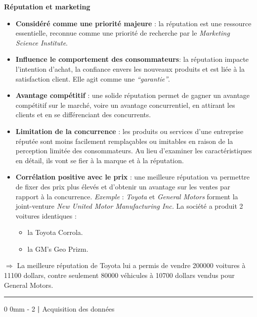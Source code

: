 \documentclass[
  12pt,
]{report}
\makeatletter
\providecommand{\tightlist}{%
  \setlength{\itemsep}{0pt}\setlength{\parskip}{0pt}}\usepackage{longtable,booktabs,array}
\renewcommand{\chapter}{%
    \clearpage %
    \@startsection{chapter}%
    {0} %
    {0mm} %
    {-\baselineskip} %
    {2\baselineskip} %
    {\normalfont\Huge\bfseries | \Huge\bfseries}%
}
\makeatother
\begin{document}
\textbf{Réputation et marketing}

\begin{itemize}
\item
  \textbf{Considéré comme une priorité majeure} : la réputation est une
  ressource essentielle, reconnue comme une priorité de recherche par le
  \emph{Marketing Science Institute}.
\item
  \textbf{Influence le comportement des consommateurs}: la réputation
  impacte l'intention d'achat, la confiance envers les nouveaux produits
  et est liée à la satisfaction client. Elle agit comme une
  \emph{``garantie''}.
\item
  \textbf{Avantage compétitif} : une solide réputation permet de gagner
  un avantage compétitif sur le marché, voire un avantage concurrentiel,
  en attirant les clients et en se différenciant des concurrents.
\item
  \textbf{Limitation de la concurrence} : les produits ou services d'une
  entreprise réputée sont moins facilement remplaçables ou imitables en
  raison de la perception limitée des consommateurs. Au lieu d'examiner
  les caractéristiques en détail, ils vont se fier à la marque et à la
  réputation.
\item
  \textbf{Corrélation positive avec le prix} : une meilleure réputation
  va permettre de fixer des prix plus élevés et d'obtenir un avantage
  sur les ventes par rapport à la concurrence. \emph{Exemple} :
  \emph{Toyota} et \emph{General Motors} forment la joint-venture
  \emph{New United Motor Manufacturing Inc.} La société a produit 2
  voitures identiques :

  \begin{itemize}
  \tightlist
  \item
    la Toyota Corrola.
  \item
    la GM's Geo Prizm.
  \end{itemize}
\end{itemize}

\(\Rightarrow\) La meilleure réputation de Toyota lui a permis de vendre
200000 voitures à 11100 dollars, contre seulement 80000 véhicules à
10700 dollars vendus pour General Motors.

\begin{center}\rule{0.5\linewidth}{0.5pt}\end{center}

\chapter{Acquisition des données}\label{acquisition-des-donnuxe9es}
\end{document}
